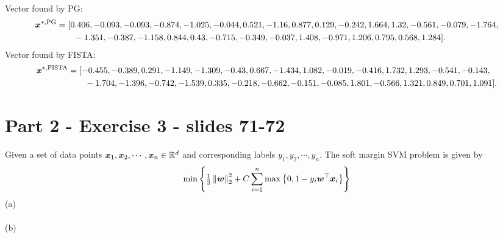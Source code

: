        Vector found by PG: 
       \begin{align*}
       \boldsymbol x^{*,\text{PG}} &= [0.406, -0.093, -0.093, -0.874, -1.025, -0.044,  0.521, -1.16 ,
        0.877,  0.129, -0.242,  1.664,  1.32 , -0.561, -0.079, -1.764,\\& \qquad 
       -1.351, -0.387, -1.158,  0.844,  0.43 , -0.715, -0.349, -0.037,
        1.408, -0.971,  1.206,  0.795,  0.568,  1.284].
       \end{align*}
       Vector found by FISTA: 
\begin{align*}\boldsymbol x^{*,\text{FISTA}} &= [-0.455, -0.389,  0.291, -1.149, -1.309, -0.43 ,  0.667, -1.434,
        1.082, -0.019, -0.416,  1.732,  1.293, -0.541, -0.143,\\& \qquad  -1.704,
       -1.396, -0.742, -1.539,  0.335, -0.218, -0.662, -0.151, -0.085,
        1.801, -0.566,  1.321,  0.849,  0.701,  1.091].\end{align*}

%
\section{Part 2 - Exercise 3 - slides 71-72}
%
Given a set of data points $\boldsymbol x_1, \boldsymbol x_2,\cdots,\boldsymbol x_n \in \mathbb{R}^d$ and 
corresponding labels $y_1,y_2,\cdots,y_n$. The soft margin SVM problem is given 
by 
\begin{equation*}
    \min \left\{{\textstyle\frac{1}{2}}\left\lVert\boldsymbol w\right\rVert_{2}^2+C \sum_{i=1}^{n} \max 
    \left\{0,1-y_i \boldsymbol w^\top \boldsymbol x_i\right\}\right\}
\end{equation*}
%
\indent (a) \\
%
\\
\indent (b) \\



